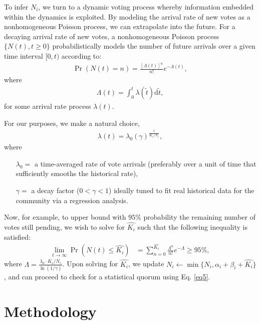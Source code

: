 \documentclass[format=acmsmall, review=true, screen=true, anonymous=true]{acmart}
\begin{document}
To infer $N_i$, we turn to a dynamic voting process whereby information embedded within the dynamics is exploited.  By modeling the arrival rate of new votes as a nonhomogeneous Poisson process, we can extrapolate into the future.  For a decaying arrival rate of new votes, a nonhomogeneous Poisson process $\{N(t),t\geq 0\}$ probabilistically models the number of future arrivals over a given time interval $[0,t)$ according to:
\begin{align*}
\Pr(N(t)=n)={\frac {[\Lambda (t)]^{n}}{n!}}e^{-\Lambda (t)},
\end{align*}
where
\begin{align*}
\Lambda (t)=\int _{0}^{t}\lambda (\tilde{t})\mathrm{d}\tilde{t},
\end{align*}
for some arrival rate process $\lambda (t)$.

For our purposes, we make a natural choice,
\begin{align}\label{eq6}
\lambda (t) = \lambda_0 {(\gamma)}^{\frac{t}{K_i/N_i}},
\end{align}
where
\begin{itemize}
\item[$\lambda_0 =$] a time-averaged rate of vote arrivals (preferably over a unit of time that sufficiently smooths the historical rate),
\item[$\gamma =$] a decay factor ($0 < \gamma < 1$) ideally tuned to fit real historical data for the community via a regression analysis.
\end{itemize}
Now, for example, to upper bound with $95\%$ probability the remaining number of votes still pending, we wish to solve for $\hat{K_i}$ such that the following inequality is satisfied:
\begin{align}\label{eq7}
\lim_{t\rightarrow \infty}\Pr\left(N(t)\leq \hat{K_i}\right) & = \sum_{n=0}^{\hat{K_i}} \frac{\Lambda^n}{n!}e^{-\Lambda} \geq 95\%,
\end{align}
where $\Lambda = \frac{\lambda_0 \cdot K_i/N_i}{\ln{(1/\gamma)}}$.
Upon solving for $\hat{K_i}$, we update $N_i \leftarrow \min\{N_i,\alpha_i + \beta_i + \hat{K_i}\}$, and can proceed to check for a statistical quorum using Eq. \ref{eq5}.


\section{Methodology}
\label{sec:methodology}
\end{document}

